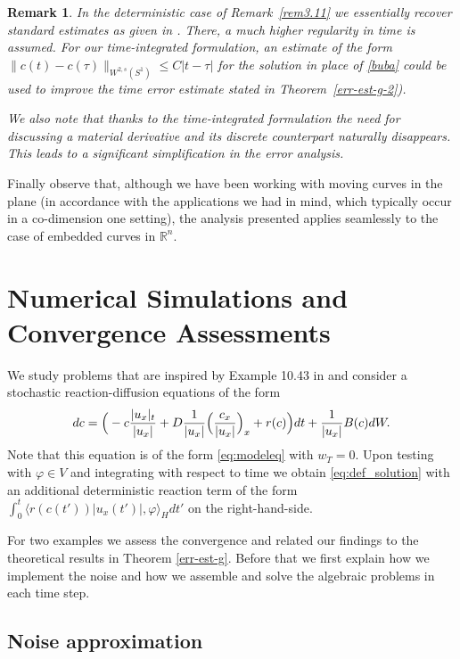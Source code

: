 \documentclass[a4paper,10pt]{article}
\newtheorem{rem}[cor]{Remark}
\newcommand{\R}{\mathbb{R}}
\numberwithin{equation}{section}
\begin{document}
\begin{rem}

In the deterministic case of Remark~\ref{rem3.11} we essentially recover standard estimates as given in \cite[Theorem~2.4]{DE12}. There, a much higher regularity in time is assumed. For our time-integrated formulation, an estimate of the form $\| c(t) - c(\tau)\|_{W^{2,s}(S^{1})} \leq C |t-\tau|$ for the solution in place of \eqref{buba} 
could be used to improve the time error estimate stated in Theorem~\ref{err-est-g-2}).

We also note that thanks to the time-integrated formulation the need for discussing a material derivative and its discrete counterpart naturally disappears. This leads to a significant simplification in the error analysis.
\end{rem}

Finally observe that, although we have been working with moving curves in the plane (in accordance with the applications we had in mind, which typically occur in a co-dimension one setting), the analysis presented applies seamlessly to the case of embedded curves in $\R^{n}$.

\section{Numerical Simulations and Convergence Assessments}


We study problems that are inspired by Example 10.43 in \cite{Powell} and consider a stochastic reaction-diffusion equations of the form
\[
 dc = \Big{(} - c \frac{|u_x|_t}{|u_x|} + D \frac{1}{|u_x|} \Big{(} \frac{c_x}{|u_x|} \Big{)}_x + r(c) \Big{)} dt + \frac{1}{|u_{x}|} B(c) dW.
\]
Note that this equation is of the form \eqref{eq:modeleq} with $w_{T}=0$. Upon testing with $\varphi \in V$ and integrating with respect to time we obtain \eqref{eq:def_solution} with an additional deterministic reaction term of the form $\int_0^t \langle r(c(t')) |u_x(t')|, \varphi \rangle_{H} dt'$ on the right-hand-side.

For two examples we assess the convergence and related our findings to the theoretical results in Theorem \ref{err-est-g}. Before that we first explain how we implement the noise and how we assemble and solve the algebraic problems in each time step.



\subsection{Noise approximation}
\end{document}

